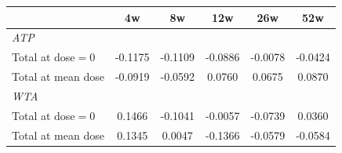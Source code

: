 \begin{tabular}{l*{5}{c}}
\toprule
 & 4w & 8w & 12w & 26w & 52w \\
\midrule
\multicolumn{6}{l}{\textit{ATP}} \\
\quad Total at dose$=0$ & -0.1175 & -0.1109 & -0.0886 & -0.0078 & -0.0424 \\
\quad Total at mean dose & -0.0919 & -0.0592 & 0.0760 & 0.0675 & 0.0870 \\[0.3em]
\multicolumn{6}{l}{\textit{WTA}} \\
\quad Total at dose$=0$ & 0.1466 & -0.1041 & -0.0057 & -0.0739 & 0.0360 \\
\quad Total at mean dose & 0.1345 & 0.0047 & -0.1366 & -0.0579 & -0.0584 \\
\bottomrule
\end{tabular}
